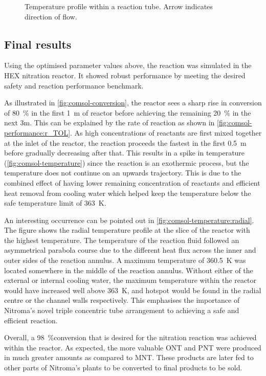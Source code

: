 \begin{figure}[h]
\begin{minipage}[t]{0.42\linewidth}
        \caption{Temperature profile within a reaction tube. Arrow indicates direction of flow.}
        \label{fig:comsol-temperature:surface}
    \end{minipage}
\end{figure}

\subsection{Final results}
\label{finalresults}
Using the optimised parameter values above, the reaction was simulated in the HEX nitration reactor. It showed robust performance by meeting the desired safety and reaction performance benchmark.

As illustrated in \cref{fig:comsol-conversion}, the reactor sees a sharp rise in conversion of \approx \SI{80}{\percent} in the first \SI{1}{\metre} of reactor before achieving the remaining \SI{20}{\percent} in the next \approx 3m. This can be explained by the rate of reaction as shown in \cref{fig:comsol-performance:r_TOL}. As high concentrations of reactants are first mixed together at the inlet of the reactor, the reaction proceeds the fastest in the first \SI{0.5}{\metre} before gradually decreasing after that. This results in a spike in temperature (\cref{fig:comsol-temperature}) since the reaction is an exothermic process, but the temperature does not continue on an upwards trajectory. This is due to the combined effect of having lower remaining concentration of reactants and efficient heat removal from cooling water which helped keep the temperature below the safe temperature limit of \SI{363}{\K}. 

An interesting occurrence can be pointed out in \cref{fig:comsol-temperature:radial}. The figure shows the radial temperature profile at the slice of the reactor with the highest temperature. The temperature of the reaction fluid followed an asymmetrical parabola course due to the different heat flux across the inner and outer sides of the reaction annulus. A maximum temperature of \approx \SI{360.5}{\K} was located somewhere in the middle of the reaction annulus. Without either of the external or internal cooling water, the maximum temperature within the reactor would have increased well above \SI{363}{\K}, and hotspot would be found in the radial centre or the channel walls respectively. This emphasises the importance of Nitroma's novel triple concentric tube arrangement to achieving a safe and efficient reaction.

Overall, a \SI{98}{\%}conversion that is desired for the nitration reaction was achieved within the reactor. As expected, the more valuable ONT and PNT were produced in much greater amounts as compared to MNT. These products are later fed to other parts of Nitroma's plants to be converted to final products to be sold.

